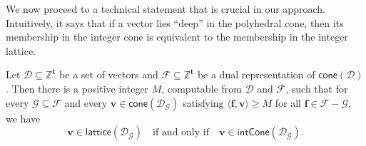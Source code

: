 \documentclass{article}
\renewcommand{\geq}{\geqslant}
\newcommand{\Dd}{\mathcal{D}}
\newcommand{\Z}{\mathbb{Z}}
\newcommand{\tup}[1]{{\mathbf{#1}}}
\newcommand{\tv}{\tup t}
\newcommand{\ff}{\tup f}
\newcommand{\myvv}{\tup v} %
\newcommand{\Ff}{\mathcal{F}}
\newcommand{\Gg}{\mathcal{G}}
\newcommand{\sca}[2]{\langle #1,#2\rangle}
\renewcommand{\setminus}{-}
\newcommand{\realcone}{\mathsf{cone}}
\newcommand{\intcone}{\mathsf{intCone}}
\newcommand{\lattice}{\mathsf{lattice}}
\begin{document}
We now proceed to a technical statement that is crucial in our approach. Intuitively, it says that if a vector lies ``deep'' in the polyhedral cone, then its membership in the integer cone is equivalent to the membership in the integer lattice.

\begin{lemma}\label{lem:cornetto}
 Let $\Dd\subseteq \Z^\tv$ be a set of vectors and $\Ff\subseteq \Z^\tv$ be a dual representation of $\realcone(\Dd)$. Then there is a positive integer $M$, computable from $\Dd$ and $\Ff$, such that for every $\Gg\subseteq \Ff$ and every $\myvv\in \realcone(\Dd_\Gg)$ satisfying $\sca{\ff}{\myvv}\geq M$ for all $\ff\in \Ff\setminus \Gg$, we have
 $$\myvv\in \lattice(\Dd_\Gg)\quad\textrm{if and only if}\quad \myvv\in \intcone(\Dd_\Gg).$$
\end{lemma}
\end{document}
